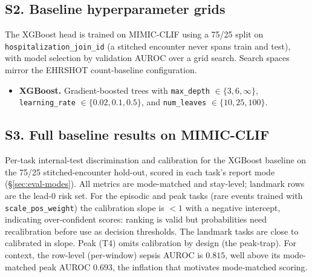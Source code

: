 \subsection*{S2. Baseline hyperparameter grids}

The XGBoost head is trained on MIMIC-CLIF using a 75/25 split on
\texttt{hospitalization\_join\_id} (a stitched encounter never spans
train and test), with model selection by validation AUROC over a grid
search. Search spaces mirror the EHRSHOT count-baseline configuration.

\begin{itemize}[leftmargin=1.5em]
  \item \textbf{XGBoost.} Gradient-boosted trees with
        \texttt{max\_depth} $\in \{3, 6, \infty\}$,
        \texttt{learning\_rate} $\in \{0.02, 0.1, 0.5\}$, and
        \texttt{num\_leaves} $\in \{10, 25, 100\}$.
\end{itemize}

\subsection*{S3. Full baseline results on MIMIC-CLIF}

Per-task internal-test discrimination and calibration for the XGBoost
baseline on the 75/25 stitched-encounter hold-out, scored in each task's
report mode (\S\ref{sec:eval-modes}). All metrics are mode-matched and
stay-level; landmark rows are the lead-0 risk set. For the episodic and
peak tasks (rare events trained with \texttt{scale\_pos\_weight}) the
calibration slope is $<1$ with a negative intercept, indicating
over-confident scores: ranking is valid but probabilities need
recalibration before use as decision thresholds. The landmark tasks are
close to calibrated in slope. Peak (T4) omits calibration by design (the
peak-trap). For context, the row-level (per-window) sepsis AUROC is
$0.815$, well above its mode-matched peak AUROC $0.693$, the inflation
that motivates mode-matched scoring.

